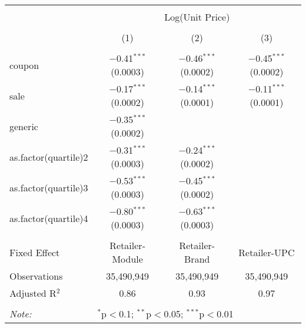 
\begin{table}[!htbp] \centering 
  \caption{} 
  \label{tab:overallSavings} 
\begin{tabular}{@{\extracolsep{5pt}}lccc} 
\\[-1.8ex]\hline 
\hline \\[-1.8ex] 
 & \multicolumn{3}{c}{Log(Unit Price)} \\ 
\\[-1.8ex] & (1) & (2) & (3)\\ 
\hline \\[-1.8ex] 
 coupon & $-$0.41$^{***}$ (0.0003) & $-$0.46$^{***}$ (0.0002) & $-$0.45$^{***}$ (0.0002) \\ 
  sale & $-$0.17$^{***}$ (0.0002) & $-$0.14$^{***}$ (0.0001) & $-$0.11$^{***}$ (0.0001) \\ 
  generic & $-$0.35$^{***}$ (0.0002) &  &  \\ 
  as.factor(quartile)2 & $-$0.31$^{***}$ (0.0003) & $-$0.24$^{***}$ (0.0002) &  \\ 
  as.factor(quartile)3 & $-$0.53$^{***}$ (0.0003) & $-$0.45$^{***}$ (0.0002) &  \\ 
  as.factor(quartile)4 & $-$0.80$^{***}$ (0.0003) & $-$0.63$^{***}$ (0.0003) &  \\ 
 \hline \\[-1.8ex] 
Fixed Effect & Retailer-Module & Retailer-Brand & Retailer-UPC \\ 
Observations & 35,490,949 & 35,490,949 & 35,490,949 \\ 
Adjusted R$^{2}$ & 0.86 & 0.93 & 0.97 \\ 
\hline 
\hline \\[-1.8ex] 
\textit{Note:}  & \multicolumn{3}{l}{$^{*}$p$<$0.1; $^{**}$p$<$0.05; $^{***}$p$<$0.01} \\ 
\end{tabular} 
\end{table} 
